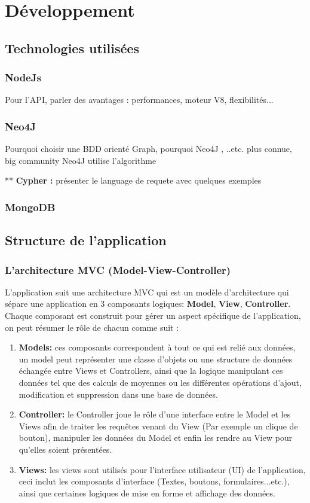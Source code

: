 \chapter{Développement}
\section{Technologies utilisées}
\subsection{NodeJs}
Pour l'API, parler des avantages : performances, moteur V8, flexibilités...  
\subsection{Neo4J}
Pourquoi choisir une BDD orienté Graph, pourquoi Neo4J , ..etc.
plus connue, big community
Neo4J utilise l'algorithme 

** \textbf{Cypher : } présenter le language de requete avec quelques exemples
\subsection{MongoDB}
		
\section{Structure de l'application}
	\subsection{L'architecture MVC (Model-View-Controller)}
	L'application suit une architecture MVC qui est un modèle d'architecture qui sépare une application en 3 composants logiques: \textbf{Model}, \textbf{View}, \textbf{Controller}.
	Chaque composant est construit pour gérer un aspect spécifique de l'application, on peut résumer le rôle de chacun comme suit :
	\begin{enumerate}
	\item \textbf{Models: } ces composants correspondent à tout ce qui est relié aux données, un model peut représenter une classe d'objets ou une structure de données échangée entre Views et Controllers, ainsi que la logique manipulant ces données tel que des calculs de moyennes ou les différentes opérations d'ajout, modification et suppression dans une base de données.
	\item \textbf{Controller: } le Controller joue le rôle d'une interface entre le Model et les Views afin de traiter les requêtes venant du View (Par exemple un clique de bouton), manipuler les données du Model et enfin les rendre au View pour qu'elles soient présentées.
	\item \textbf{Views:} les views sont utilisés pour l'interface utilisateur (UI) de l'application, ceci inclut les composants d'interface (Textes, boutons, formulaires...etc.), ainsi que certaines logiques de mise en forme et affichage des données.
	\end{enumerate}
	
